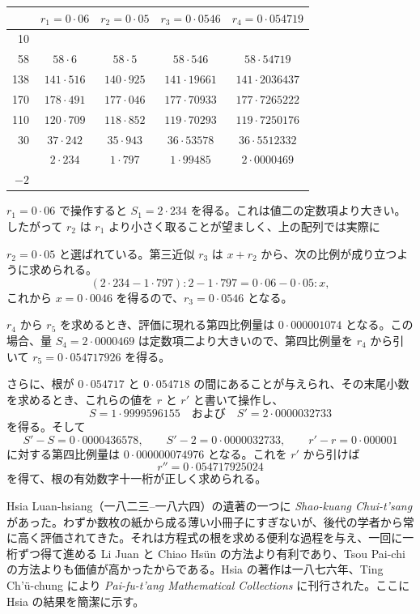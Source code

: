 \documentclass[11pt]{article}
\newcommand{\scanpage}[2]{\clearpage\setcounter{footnote}{0}\noindent{\footnotesize\color{gray}PDF #1 頁 · #2}\par\medskip}
\newcommand{\scanfooter}{}
\begin{document}
\begin{center}
\small
\renewcommand{\arraystretch}{1.12}
\begin{tabular}{|r|c|c|c|c|}
\hline
& $r_1=0\cdot 06$ & $r_2=0\cdot 05$ & $r_3=0\cdot 0546$ & $r_4=0\cdot 054719$ \\
\hline
10  & & & & \\
58  & $58\cdot 6$ & $58\cdot 5$ & $58\cdot 546$ & $58\cdot 54719$ \\
138 & $141\cdot 516$ & $140\cdot 925$ & $141\cdot 19661$ & $141\cdot 2036437$ \\
170 & $178\cdot 491$ & $177\cdot 046$ & $177\cdot 70933$ & $177\cdot 7265222$ \\
110 & $120\cdot 709$ & $118\cdot 852$ & $119\cdot 70293$ & $119\cdot 7250176$ \\
30  & $37\cdot 242$ & $35\cdot 943$ & $36\cdot 53578$ & $36\cdot 5512332$ \\
    & $2\cdot 234$ & $1\cdot 797$ & $1\cdot 99485$ & $2\cdot 0000469$ \\
$-2$ & & & & \\
\hline
\end{tabular}
\end{center}

$r_1=0\cdot 06$ で操作すると $S_1=2\cdot 234$ を得る。これは値二の定数項より大きい。したがって $r_2$ は $r_1$ より小さく取ることが望ましく、上の配列では実際に
\scanfooter

\scanpage{0146}{第19章、印刷頁132}
$r_2=0\cdot 05$ と選ばれている。第三近似 $r_3$ は $x+r_2$ から、次の比例が成り立つように求められる。
\[
(2\cdot 234-1\cdot 797):2-1\cdot 797=0\cdot 06-0\cdot 05:x,
\]
これから $x=0\cdot 0046$ を得るので、$r_3=0\cdot 0546$ となる。

$r_4$ から $r_5$ を求めるとき、評価に現れる第四比例量は $0\cdot 000001074$ となる。この場合、量 $S_4=2\cdot 0000469$ は定数項二より大きいので、第四比例量を $r_4$ から引いて $r_5=0\cdot 054717926$ を得る。

さらに、根が $0\cdot 054717$ と $0\cdot 054718$ の間にあることが与えられ、その末尾小数を求めるとき、これらの値を $r$ と $r'$ と書いて操作し、
\[
S=1\cdot 9999596155\quad\text{および}\quad S'=2\cdot 0000032733
\]
を得る。そして
\[
S'-S=0\cdot 0000436578,
\qquad S'-2=0\cdot 0000032733,
\qquad r'-r=0\cdot 000001
\]
に対する第四比例量は $0\cdot 000000074976$ となる。これを $r'$ から引けば
\[
r''=0\cdot 054717925024
\]
を得て、根の有効数字十一桁が正しく求められる。

Hsia Luan-hsiang（一八二三--一八六四）の遺著の一つに \emph{Shao-kuang Chui-t'sang} があった。わずか数枚の紙から成る薄い小冊子にすぎないが、後代の学者から常に高く評価されてきた。それは方程式の根を求める便利な過程を与え、一回に一桁ずつ得て進める Li Juan と Chiao Hsün の方法より有利であり、Tsou Pai-chi の方法よりも価値が高かったからである。Hsia の著作は一八七六年、Ting Ch'ü-chung により \emph{Pai-fu-t'ang Mathematical Collections} に刊行された。ここに Hsia の結果を簡潔に示す。
\end{document}
